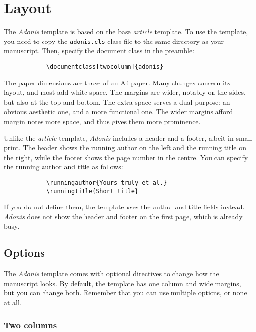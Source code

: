 \documentclass{adonis}
\begin{document}
	\section{Layout}
	
		The \textit{Adonis} template is based on the base \textit{article} template.
		To use the template, you need to copy the \verb+adonis.cls+ class file to the same directory as your manuscript.
		Then, specify the document class in the preamble:
		
		\begin{verbatim}
			\documentclass[twocolumn]{adonis}
		\end{verbatim}
		
		The paper dimensions are those of an A4 paper.
		Many changes concern its layout, and most add white space.
		The margins are wider, notably on the sides, but also at the top and bottom.
		The extra space serves a dual purpose: an obvious aesthetic one, and a more functional one.
		The wider margins afford margin notes more space, and thus gives them more prominence.
		
		Unlike the \textit{article} template, \textit{Adonis} includes a header and a footer, albeit in small print.
		The header shows the running author on the left and the running title on the right, while the footer shows the page number in the centre.
		You can specify the running author and title as follows:
		
		\begin{verbatim}
			\runningauthor{Yours truly et al.}
			\runningtitle{Short title}
		\end{verbatim}
		
		If you do not define them, the template uses the author and title fields instead.
		\textit{Adonis} does not show the header and footer on the first page, which is already busy.
		
		\subsection{Options}
		
			The \textit{Adonis} template comes with optional directives to change how the manuscript looks.
			By default, the template has one column and wide margins, but you can change both.
			Remember that you can use multiple options, or none at all.
		
			\subsubsection{Two columns}
			
\end{document}
